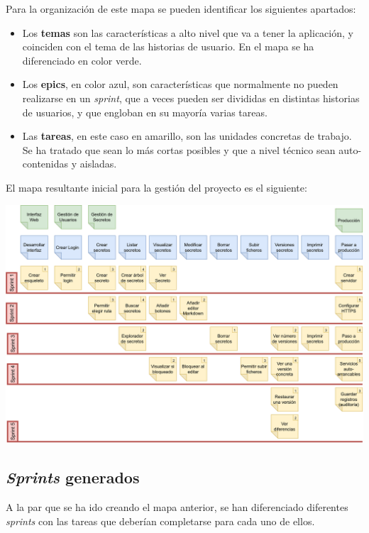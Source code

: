 \documentclass{\ClassPath/viu-tfm-template}
\begin{document}
Para la organización de este mapa se pueden identificar los siguientes apartados:
\begin{itemize}
    \item Los \textbf{temas} son las características a alto nivel que va a tener la aplicación, y coinciden con el tema de las historias de usuario. En el mapa se ha diferenciado en color verde.
    \item Los \textbf{epics}, en color azul, son características que normalmente no pueden realizarse en un \textit{sprint}, que a veces pueden ser divididas en distintas historias de usuarios, y que engloban en su mayoría varias tareas.
    \item Las \textbf{tareas}, en este caso en amarillo, son las unidades concretas de trabajo. Se ha tratado que sean lo más cortas posibles y que a nivel técnico sean auto-contenidas y aisladas.
\end{itemize}

El mapa resultante inicial para la gestión del proyecto es el siguiente:

\begin{center}
    \includegraphics[width=\linewidth]{img/kanban.png}
\end{center}

\subsection{\textit{Sprints} generados}

A la par que se ha ido creando el mapa anterior, se han diferenciado diferentes \textit{sprints} con las tareas que deberían completarse para cada uno de ellos.
\end{document}
